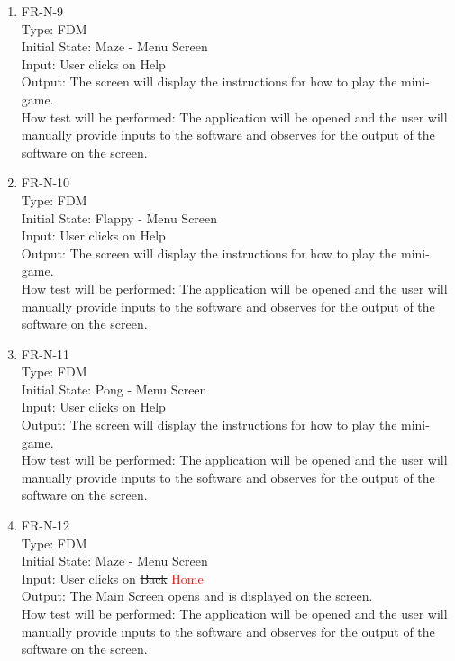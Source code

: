 \documentclass[12pt, titlepage]{article}
\begin{document}
\begin{enumerate}
\item{FR-N-9\\}
Type: FDM\\
Initial State: Maze - Menu Screen\\
Input: User clicks on Help\\
Output: The screen will display the instructions for how to play the mini-game.\\
How test will be performed: The application will be opened and the user will manually provide inputs to the software and observes for the output of the software on the screen.\\

\item{FR-N-10\\}
Type: FDM\\
Initial State: Flappy - Menu Screen\\
Input: User clicks on Help\\
Output: The screen will display the instructions for how to play the mini-game.\\
How test will be performed: The application will be opened and the user will manually provide inputs to the software and observes for the output of the software on the screen.\\

\item{FR-N-11\\}
Type: FDM\\
Initial State: Pong - Menu Screen\\
Input: User clicks on Help\\
Output: The screen will display the instructions for how to play the mini-game.\\
How test will be performed: The application will be opened and the user will manually provide inputs to the software and observes for the output of the software on the screen.\\

\item{FR-N-12\\}
Type: FDM\\
Initial State: Maze - Menu Screen\\
Input: User clicks on \sout{Back} \textcolor{red}{Home}\\
Output: The Main Screen opens and is displayed on the screen.\\
How test will be performed: The application will be opened and the user will manually provide inputs to the software and observes for the output of the software on the screen.\\


\end{enumerate}
\end{document}
